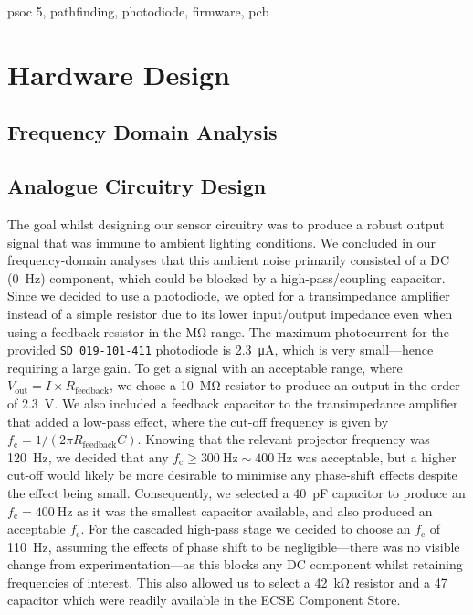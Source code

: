 \documentclass[conference]{IEEEtran}
\begin{document}
\begin{IEEEkeywords}
	psoc 5, pathfinding, photodiode, firmware, pcb
\end{IEEEkeywords}



\section{Hardware Design}

\subsection{Frequency Domain Analysis}


\subsection{Analogue Circuitry Design}

The goal whilst designing our sensor circuitry was to produce a robust output signal that was immune to ambient lighting conditions.
We concluded in our frequency-domain analyses that this ambient noise primarily consisted of a DC (\qty{0}{\hertz}) component, which could be blocked by a high-pass/coupling capacitor.
Since we decided to use a photodiode, we opted for a transimpedance amplifier instead of a simple resistor due to its lower input/output impedance even when using a feedback resistor in the \unit{\Mohm} range.
The maximum photocurrent for the provided \texttt{SD 019-101-411} photodiode is \qty{2.3}{\uA}, which is very small—hence requiring a large gain.
To get a signal with an acceptable range, where $V_\text{out} = I \times R_\text{feedback}$, we chose a \qty{10}{\Mohm} resistor to produce an output in the order of \qty{2.3}{\volt}.
We also included a feedback capacitor to the transimpedance amplifier that added a low-pass effect, where the cut-off frequency is given by $f_\text{c} = 1 / (2\pi R_\text{feedback}C)$.
Knowing that the relevant projector frequency was \qty{120}{\hertz}, we decided that any $f_\text{c}\geq \qty{300}{\hertz}\sim \qty{400}{\hertz}$ was acceptable, but a higher cut-off would likely be more desirable to minimise any phase-shift effects despite the effect being small.
Consequently, we selected a \qty{40}{\pF} capacitor to produce an $f_\text{c}=\qty{400}{\hertz}$ as it was the smallest capacitor available, and also produced an acceptable $f_\text{c}$.
For the cascaded high-pass stage we decided to choose an $f_\text{c}$ of \qty{110}{\hertz}, assuming the effects of phase shift to be negligible—there was no visible change from experimentation—as this blocks any DC component whilst retaining frequencies of interest.
This also allowed us to select a \qty{42}{\kohm} resistor and a \qty{47}{\uF} capacitor which were readily available in the ECSE Component Store.
\end{document}

